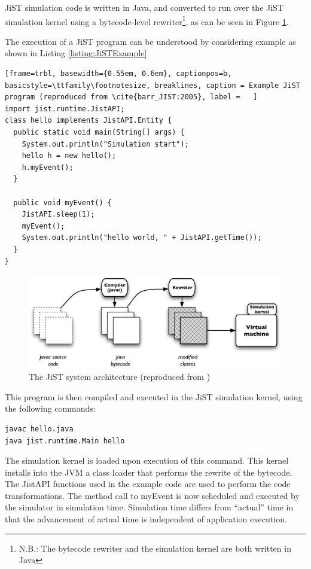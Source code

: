JiST simulation code is written in Java, and converted to run over the JiST 
simulation kernel using a bytecode-level rewriter\footnote{N.B.: The bytecode 
rewriter and the simulation kernel are both written in Java},  as can be seen 
in Figure \ref{Fig:JiST_architecture}.

The execution of a JiST program can be understood by considering example as
shown in Listing \ref{listing:JiSTExample}

\begin{lstlisting}[frame=trbl, basewidth={0.55em, 0.6em}, captionpos=b, 
basicstyle=\ttfamily\footnotesize, breaklines, caption = Example JiST program (reproduced from \cite{barr_JIST:2005}, label =   ]  
import jist.runtime.JistAPI;  
class hello implements JistAPI.Entity { 
  public static void main(String[] args) { 
    System.out.println("Simulation start"); 
    hello h = new hello(); 
    h.myEvent(); 
  } 
 
  public void myEvent() { 
    JistAPI.sleep(1); 
    myEvent(); 
    System.out.println("hello world, " + JistAPI.getTime()); 
  } 
} 
\end{lstlisting}

\begin{figure}
\centering
\label{Fig:JiST_architecture}
\includegraphics[scale=0.72]{img/JiST_architecture.eps} \caption[The JiST 
System Architecture]{The JiST system architecture (reproduced from
\cite{barr_JIST:2005})}
\end{figure} 
 
This program is then compiled and executed in the JiST simulation
kernel, using the following commands:

  
\begin{lstlisting}[frame=trbl, basewidth={0.55em, 0.6em}, captionpos=b, 
basicstyle=\ttfamily\footnotesize, breaklines, caption = Execution of the
program in the JiST, label = listing:JiST ]  
javac hello.java
java jist.runtime.Main hello
\end{lstlisting}


The simulation kernel is loaded upon execution of this command. This kernel
installs into the JVM a class loader that performs the rewrite of the bytecode.
The JistAPI functions used in the example code are used to perform the
code transformations. The method call to myEvent is now scheduled and executed
by the simulator in simulation time. Simulation time differs from ``actual''
time in that the advancement of actual time is independent of application
execution. 
 
